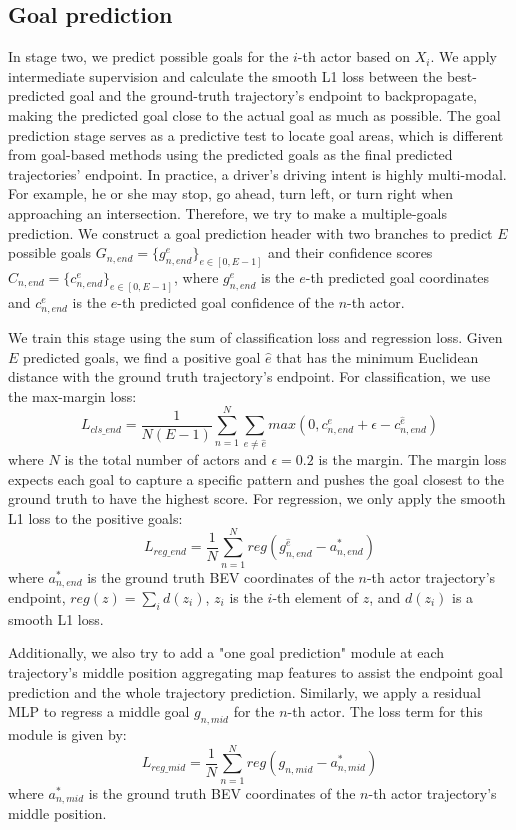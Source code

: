 \subsection{Goal prediction}
In stage two, we predict possible goals for the $i$-th actor based on $X_i$. 
We apply intermediate supervision and calculate the smooth L1 loss between the best-predicted goal and the ground-truth trajectory's endpoint to backpropagate, making the predicted goal close to the actual goal as much as possible. 
The goal prediction stage serves as a predictive test to locate goal areas, which is different from goal-based methods using the predicted goals as the final predicted trajectories' endpoint. 
In practice, a driver's driving intent is highly multi-modal. 
For example, he or she may stop, go ahead, turn left, or turn right when approaching an intersection. 
Therefore, we try to make a multiple-goals prediction. 
We construct a goal prediction header with two branches to predict $E$ possible goals $G_{n,end} =\{g_{n,end}^e\}_{e \in [0,E-1]}$ and their confidence scores $    C_{n,end} = \{c_{n,end}^e\}_{e \in [0,E-1]}$, 
where $g_{n,end}^e$ is the $e$-th predicted goal coordinates and $c_{n,end}^e$ is the $e$-th predicted goal confidence of the $n$-th actor.

We train this stage using the sum of classification loss and regression loss.
Given $E$ predicted goals, we find a positive goal $\hat{e}$ that has the minimum Euclidean distance with the ground truth trajectory's endpoint. 
For classification, we use the max-margin loss:
\begin{equation}
	L_{cls\_end}=\frac{1}{N(E-1)}\sum_{n=1}^N\sum_{e\neq \hat{e}}{max(0,c^e_{n,end}+\epsilon -c^{\hat{e}}_{n,end})}
\end{equation}
where $N$ is the total number of actors and $\epsilon =0.2$ is the margin. The margin loss expects each goal to capture a specific pattern and pushes the goal closest to the ground truth to have the highest score.
For regression, we only apply the smooth L1 loss to the positive goals:
\begin{equation}
	L_{reg\_end}=\frac{1}{N}\sum_{n=1}^N{reg(g_{n,end}^{\hat{e}}-a^{*}_{n,end})}
\end{equation}
where $a^{*}_{n,end}$ is the ground truth BEV coordinates of the $n$-th actor trajectory's endpoint, $reg(z) = \sum_id(z_i)$, $z_i$ is the $i$-th element of $z$, and $d(z_i)$ is a smooth L1 loss.

Additionally, we also try to add a "one goal prediction" module at each trajectory's middle position aggregating map features to assist the endpoint goal prediction and the whole trajectory prediction.
Similarly, we apply a residual MLP to regress a middle goal $g_{n,mid}$ for the $n$-th actor. 
The loss term for this module is given by:
\begin{equation}
	L_{reg\_mid} = \frac{1}{N}\sum_{n=1}^N {reg(g_{n,mid}-a^*_{n,mid})}
\end{equation}
where $a^*_{n,mid}$ is the ground truth BEV coordinates of the $n$-th actor trajectory's middle position.

